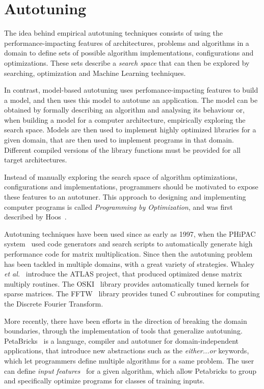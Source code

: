 \documentclass[a4paper, 12pt]{article}
\begin{document}
\section{Autotuning} \label{sec:autotuning}

The idea behind empirical autotuning techniques consists of using the
performance-impacting features of architectures, problems and algorithms
in a domain to define sets of possible algorithm implementations,
configurations and optimizations. These sets describe a \emph{search space}
that can then be explored by searching, optimization and Machine Learning
techniques.

In contrast, model-based autotuning uses perfomance-impacting features
to build a model, and then uses this model to autotune an application.
The model can be obtained by formally describing an algorithm and analysing
its behaviour or, when building a model for a computer architecture,
empirically exploring the search space.
Models are then used to implement highly optimized libraries for a given
domain, that are then used to implement programs in that domain. Different
compiled versions of the library functions must be provided for all target
architectures.

Instead of manually exploring the search space of algorithm optimizations,
configurations and implementations, programmers should be motivated to expose
these features to an autotuner. This approach to designing and implementing
computer programs is called \emph{Programming by Optimization}, and was
first described by Hoos~\cite{hoos2012programming}.

Autotuning techniques have been used since as early as 1997, when the PHiPAC
system~\cite{bilmes1997phipac} used code generators and search scripts to
automatically generate high performance code for matrix multiplication. Since
then the autotuning problem has been tackled in multiple domains, with a great
variety of strategies. Whaley \emph{et al.}~\cite{whaley1998atlas} introduce the
ATLAS project, that produced optimized dense matrix multiply routines. The
OSKI~\cite{vuduc2005oski} library provides automatically tuned kernels for
sparse matrices. The FFTW~\cite{frigo1998fftw} library provides tuned C
subroutines for computing the Discrete Fourier Transform.

More recently, there have been efforts in the direction of breaking the domain
boundaries, through the implementation of tools that generalize autotuning.
PetaBricks~\cite{ansel2009petabricks} is a language, compiler and autotuner for
domain-independent applications, that introduce new abstractions such as the
\emph{either...or} keywords, which let programmers define multiple algorithms
for a same problem. The user can define \emph{input
features}~\cite{ding2014autotuning} for a given algorithm, which allow
Petabricks to group and specifically optimize programs for classes of
training inputs.
\end{document}
